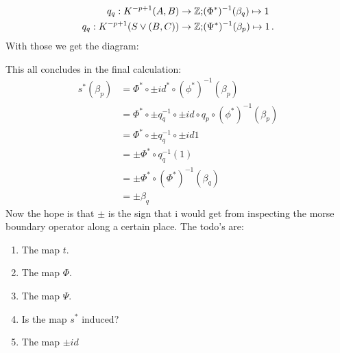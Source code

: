 \begin{cor}
	\begin{align*}
		q_q: K^{-p+1}(A,B) \to \mathbb{Z}; & (\Phi^*)^{-1}(\beta_q)\mapsto 1 \\
		q_q: K^{-p+1}(S\vee(B,C)) \to \mathbb{Z}; & (\Psi^*)^{-1}(\beta_p)\mapsto 1 \, . 
	\end{align*}
	With those we get the diagram: 
	\begin{center}
	\end{center}
	This all concludes in the final calculation: 
	\begin{align*}
		s^*(\beta_p) &= \Phi^*\circ \pm id ^*\circ (\phi^*)^{-1}(\beta_p)\\
		&= \Phi^*\circ \pm q_q^{-1}\circ \pm id \circ q_p \circ (\phi^*)^{-1}(\beta_p)\\
		&= \Phi^*\circ \pm q_q^{-1}\circ \pm id 1\\
		&= \pm \Phi^*\circ  q_q^{-1}( 1)\\
		&= \pm \Phi^*\circ  (\Phi^*)^{-1}(\beta_q) \\
		&= \pm \beta_q
	\end{align*}
	Now the hope is that $\pm$ is the sign that i would get from inspecting the morse boundary operator along a certain place.
	The todo's are:
	\begin{enumerate}
		\item The map $t$.
		\item The map $\Phi$.
		\item The map $\Psi$.
		\item Is the map $s^*$ induced?
		\item The map $\pm id$
	\end{enumerate}
\end{cor}
	